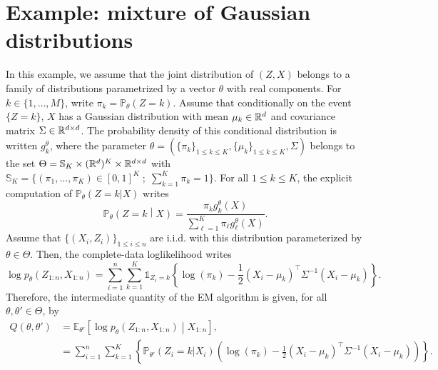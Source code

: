 \documentclass[english,graybox,envcountchap,envcountsame,sectrefs,shortlabels]{svmono}
\theoremstyle{style}
\newcommand{\eqsp}{}
\begin{document}
\section{Example: mixture of Gaussian distributions}
In this example, we assume that the joint distribution of $(Z,X)$ belongs to a family of distributions parametrized by a vector $\theta$ with real components. For $k\in\{1,\ldots,M\}$, write $\pi_k = \mathbb{P}_\theta(Z = k)$. Assume that conditionally on the event $\{Z = k\}$, $X$ has a Gaussian distribution with mean $\mu_k \in\mathbb{R}^d$ and covariance matrix $\Sigma\in \mathbb{R}^{d\times d}$. The probability density of this conditional distribution is written $g_k^\theta$, where the parameter $\theta=(\{\pi_k\}_{1\leq k \leq K}, \{\mu_k\}_{1\leq k \leq K}, \Sigma)$ belongs to the set $\Theta= \mathbb{S}_K \times (\mathbb{R}^d)^K  \times \mathbb{R}^{d \times d}$ with $\mathbb{S}_K = \{(\pi_1,\ldots,\pi_K)\in[0,1]^K\;;\; \sum_{k=1}^K \pi_k=1\}$. For all $1\leq k \leq K$, the explicit computation of $\mathbb{P}_\theta(Z=k | X)$ writes
$$
\mathbb{P}_\theta\left(Z=k\middle | X\right) = \frac{\pi_kg^{\theta}_k(X)}{\sum_{\ell=1}^{K}\pi_\ell g^{\theta}_\ell(X)}\eqsp. %
$$
Assume that $\{(X_i,Z_i)\}_{1\leq i\leq n}$ are i.i.d. with this distribution parameterized by $\theta\in\Theta$. Then, the complete-data loglikelihood writes
$$
\log p_\theta (Z_{1:n},X_{1:n}) = \sum_{i=1}^n \sum_{k=1}^K \mathds{1}_{Z_i = k}\left\{\log(\pi_k) -\frac{1}{2}(X_i - \mu_{k})^\top \Sigma^{-1}(X_i - \mu_{k})  \right\}\eqsp.%
$$
Therefore, the intermediate quantity of the EM algorithm is given, for all $\theta,\theta' \in\Theta$, by
\begin{align*}
Q(\theta,\theta') &= \mathbb{E}_{\theta'} \left[\log p_\theta (Z_{1:n},X_{1:n}) \middle | X_{1:n}\right]\eqsp,\\
&= \sum_{i=1}^n \sum_{k=1}^K \left\{ \mathbb{P}_{\theta'}(Z_i = k|X_i)\left( \log(\pi_k) -\frac{1}{2}(X_i - \mu_{k})^\top \Sigma^{-1}(X_i - \mu_{k})\right) \right\} \eqsp.%
\end{align*}
\end{document}
